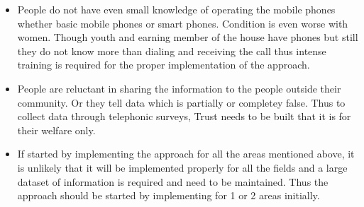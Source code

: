 \begin{itemize}


\item People do not have even small knowledge of operating the mobile phones
whether basic mobile phones or smart phones. Condition is even worse with
women. Though youth and earning member of the house have phones but
still they do not know more than dialing and receiving the call thus intense
training is required for the proper implementation of the approach.

\item People are reluctant in sharing the information to the people outside their
community. Or they tell data which is partially or completey false. Thus to
collect data through telephonic surveys, Trust needs to be built that it is for
their welfare only.

\item If started by implementing the approach for all the areas mentioned above, it
is unlikely that it will be implemented properly for all the fields and a large
dataset of information is required and need to be maintained. Thus the
approach should be started by implementing for 1 or 2 areas initially.

\end{itemize}




